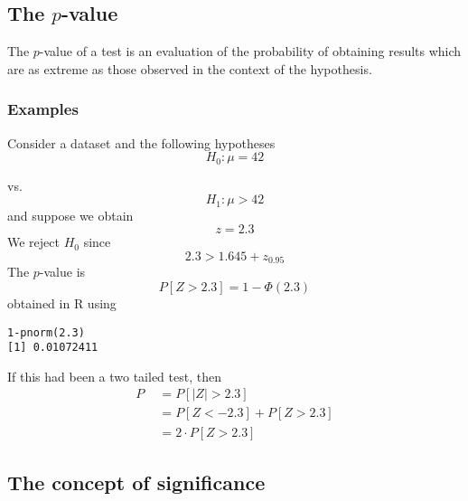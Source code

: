 \documentclass[12pt,a4paper]{article}
\theoremstyle{regla}
\theoremstyle{remark}
\theoremstyle{definition}
\theoremstyle{nonumberbreak}
\begin{document}
\subsection{The $p$-value}
\begin{fbox}
\begin{minipage}{0.97\textwidth}
The $p$-value of a test is an evaluation of the probability of obtaining results which are as extreme as those observed in the context of the hypothesis.
\end{minipage}
\end{fbox}
\subsubsection{Examples}
\begin{xmpl}
Consider a dataset and the following hypotheses \\
$$H_0:\mu=42$$

vs. $$H_1:\mu>42$$
and suppose we obtain\\
$$z=2.3$$
We reject $H_0$ since $$2.3>1.645+z_{0.95}$$
The $p$-value is
 $$P[Z>2.3]= 1-\Phi(2.3)$$
obtained in R using
\begin{lstlisting}
1-pnorm(2.3)
[1] 0.01072411
\end{lstlisting}

If this had been a two tailed test, then 
\begin{align*}
P &= P[|Z|>2.3]\\
\quad &=P[Z<-2.3]+P[Z>2.3]\\
\quad &=2\cdot P[Z>2.3]
\end{align*}
\end{xmpl}

\subsection{The concept of significance}
\end{document}
